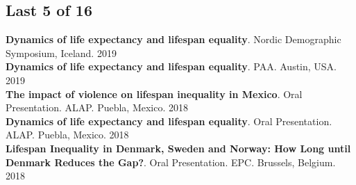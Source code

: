 \documentclass[12pt]{article}
\begin{document}
\subsection*{Last 5 of 16}
\textbf{Dynamics of life expectancy and lifespan equality}. Nordic Demographic Symposium, Iceland. \hfill { 2019}\\

\textbf{Dynamics of life expectancy and lifespan equality}. PAA. Austin, USA. \hfill { 2019}\\

\textbf{The impact of violence on lifespan inequality in Mexico}. Oral Presentation. ALAP. Puebla, Mexico. \hfill { 2018}\\

\textbf{Dynamics of life expectancy and lifespan equality}. Oral Presentation. ALAP. Puebla, Mexico. \hfill { 2018}\\

\textbf{Lifespan Inequality in Denmark, Sweden and Norway: How Long until Denmark Reduces the Gap?}. Oral Presentation. EPC. Brussels, Belgium. \hfill { 2018}\\

\end{document}
